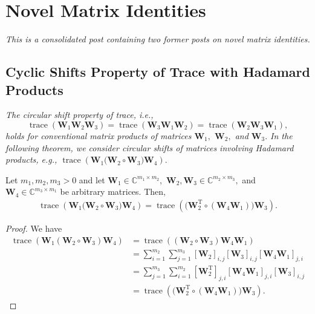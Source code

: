\section{Novel Matrix Identities}

\emph{This is a consolidated post containing two former posts on novel matrix identities.}

\subsection{Cyclic Shifts Property of Trace with Hadamard Products}

\emph{The circular shift property of trace, i.e., 
\begin{equation*}
	\operatorname{trace}\left(\boldsymbol{W}_1\boldsymbol{W}_2\boldsymbol{W}_3\right) = \operatorname{trace}\left(\boldsymbol{W}_3\boldsymbol{W}_1\boldsymbol{W}_2\right) = \operatorname{trace}\left(\boldsymbol{W}_2\boldsymbol{W}_3\boldsymbol{W}_1\right),
\end{equation*}
holds for conventional matrix products of matrices $\boldsymbol{W}_1,$ $\boldsymbol{W}_2,$ and $\boldsymbol{W}_3.$ In the following theorem, we consider circular shifts of matrices involving Hadamard products, e.g., $\operatorname{trace}\left(\boldsymbol{W}_1\big(\boldsymbol{W}_2 \circ \boldsymbol{W}_3\big) \boldsymbol{W}_4\right).$}

\begin{theorem}
	\label{lemma:htoc}
	Let $m_1, m_2, m_3 > 0$ and let $\boldsymbol{W}_1 \in \mathbb{C}^{m_1\times m_2},$ $\boldsymbol{W}_2, \boldsymbol{W}_3 \in \mathbb{C}^{m_2\times m_3},$ and $\boldsymbol{W}_4 \in \mathbb{C}^{m_3\times m_1}$ be arbitrary matrices. Then,
	\begin{align}
		\operatorname{trace}\left(\boldsymbol{W}_1\big(\boldsymbol{W}_2 \circ \boldsymbol{W}_3\big) \boldsymbol{W}_4\right) = \operatorname{trace}\left(\big(\boldsymbol{W}_2^{\mathrm{T}} \circ (\boldsymbol{W}_4\boldsymbol{W}_1)\big) \boldsymbol{W}_3\right). \label{eqn:trh}
	\end{align}
\end{theorem}
\begin{proof}
	We have
	\begin{align}
		\operatorname{trace}\left(\boldsymbol{W}_1(\boldsymbol{W}_2 \circ \boldsymbol{W}_3) \boldsymbol{W}_4\right) &= \operatorname{trace}\left((\boldsymbol{W}_2 \circ \boldsymbol{W}_3) \boldsymbol{W}_4\boldsymbol{W}_1\right) \nonumber\\ &= \sum_{i=1}^{m_2} \sum_{j=1}^{m_3} [\boldsymbol{W}_2]_{i,j}[\boldsymbol{W}_3]_{i,j} [\boldsymbol{W}_4\boldsymbol{W}_1]_{j,i} \nonumber\\
		&= \sum_{j=1}^{m_3} \sum_{i=1}^{m_2}  [\boldsymbol{W}_2^{\mathrm{T}}]_{j,i} [\boldsymbol{W}_4\boldsymbol{W}_1]_{j,i} [\boldsymbol{W}_3]_{i,j} \nonumber\\&= \operatorname{trace}\left(\big(\boldsymbol{W}_2^{\mathrm{T}} \circ (\boldsymbol{W}_4\boldsymbol{W}_1)\big) \boldsymbol{W}_3\right).
	\end{align}
\end{proof}

